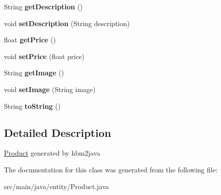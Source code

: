 \begin{DoxyCompactItemize}
String {\bfseries get\+Description} ()
\item 
\mbox{\label{classentity_1_1_product_a275f824222328131f6a00f383196da41}} 
void {\bfseries set\+Description} (String description)
\item 
\mbox{\label{classentity_1_1_product_af6bbc7b34e0ab7b7f2fe758d174fa5f4}} 
float {\bfseries get\+Price} ()
\item 
\mbox{\label{classentity_1_1_product_a096085200f5ea9730661bc114a0f929d}} 
void {\bfseries set\+Price} (float price)
\item 
\mbox{\label{classentity_1_1_product_a5466888d66016874eb475a2703cbc709}} 
String {\bfseries get\+Image} ()
\item 
\mbox{\label{classentity_1_1_product_a02b293f40f4d82e30617fdc2be6fac49}} 
void {\bfseries set\+Image} (String image)
\item 
\mbox{\label{classentity_1_1_product_ad77da4f2b6b67974fd2a040e2b930970}} 
String {\bfseries to\+String} ()
\end{DoxyCompactItemize}


\subsection{Detailed Description}
\mbox{\hyperlink{classentity_1_1_product}{Product}} generated by hbm2java 

The documentation for this class was generated from the following file\+:\begin{DoxyCompactItemize}
\item 
src/main/java/entity/Product.\+java\end{DoxyCompactItemize}
